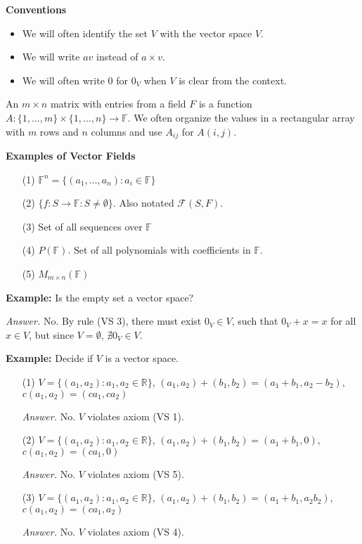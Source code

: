 \documentclass[12pt]{article}
\begin{document}
\textbf{Conventions}

\begin{itemize}
    \item We will often identify the set $V$ with the vector space $V$.
    \item We will write $av$ instead of $a \times v$.
    \item We will often write $0$ for $0_V$ when $V$ is clear from the context.
\end{itemize}

An $m \times n$ matrix with entries from a field $F$ is a function $A : \{1, \dots, m\} \times \{1, \dots, n\} \to \mathbb{F}$. We often organize the values in a rectangular array with $m$ rows and $n$ columns and use $A_{ij}$ for $A(i,j)$.

\vspace{1em}

\textbf{Examples of Vector Fields}

\begin{itemize}
    \item[(1)] $\mathbb{F}^n = \{(a_1, \dots, a_n) : a_i \in \mathbb{F}\}$
    \item[(2)] $\{f : S \to \mathbb{F} : S \neq \emptyset\}$. Also notated $\mathcal{F}(S,F)$.
    \item[(3)] Set of all sequences over $\mathbb{F}$
    \item[(4)] $P(\mathbb{F})$. Set of all polynomials with coefficients in $\mathbb{F}$.
    \item[(5)] $M_{m \times n}(\mathbb{F})$
\end{itemize}

\textbf{Example:}
Is the empty set a vector space?

\textit{Answer.} No. By rule (VS 3), there must exist $0_V \in V$, such that $0_V + x = x$ for all $x \in V$, but since $V = \emptyset$, $\nexists 0_V \in V$.

\vspace{1em}

\textbf{Example:}
Decide if $V$ is a vector space.

\begin{itemize}
    \item[(1)] $V = \{(a_1,a_2) : a_1,a_2 \in \mathbb{R}\}$, $(a_1,a_2) + (b_1,b_2) = (a_1 + b_1, a_2 - b_2)$, $c(a_1,a_2) = (ca_1,ca_2)$
    
    \textit{Answer.} No. $V$ violates axiom (VS 1).
    \item[(2)]$V = \{(a_1,a_2) : a_1,a_2 \in \mathbb{R}\}$, $(a_1,a_2) + (b_1,b_2) = (a_1 + b_1, 0)$, $c(a_1,a_2) = (ca_1,0)$
    
    \textit{Answer.} No. $V$ violates axiom (VS 5).
    
    \item[(3)]$V = \{(a_1,a_2) : a_1,a_2 \in \mathbb{R}\}$, $(a_1,a_2) + (b_1,b_2) = (a_1 + b_1, a_2b_2)$, $c(a_1,a_2) = (ca_1,a_2)$
    
    \textit{Answer.} No. $V$ violates axiom (VS 4).
\end{itemize}
\end{document}
